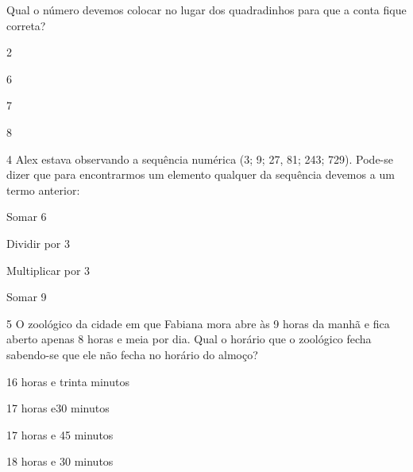 Qual o número devemos colocar no lugar dos quadradinhos para que a conta
fique correta?

\begin{escolha}
\item
  2
\item
  6
\item
  7
\item
  8
\end{escolha}


\num{4} Alex estava observando a sequência numérica (3; 9; 27, 81; 243;
729). Pode-se dizer que para encontrarmos um elemento qualquer da
sequência devemos a um termo anterior:

\begin{escolha}
\item
  Somar 6
\item
  Dividir por 3
\item
  Multiplicar por 3
\item
  Somar 9
\end{escolha}


\num{5} O zoológico da cidade em que Fabiana mora abre às 9 horas da manhã
e fica aberto apenas 8 horas e meia por dia. Qual o horário que o
zoológico fecha sabendo-se que ele não fecha no horário do almoço?

\begin{escolha}
\item
  16 horas e trinta minutos
\item
  17 horas e30 minutos
\item
  17 horas e 45 minutos
\item
  18 horas e 30 minutos
\end{escolha}


